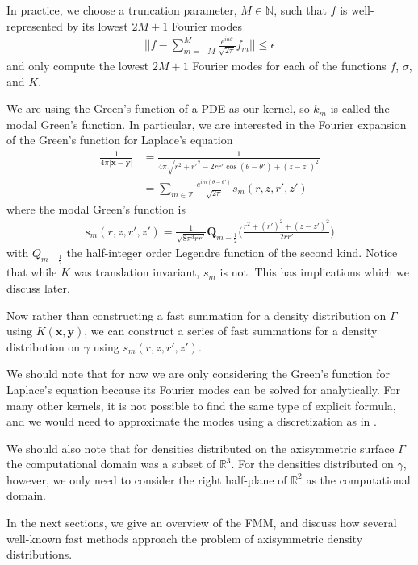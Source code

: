 \documentclass[11pt, oneside]{article}   	%
\begin{document}
In practice, we choose a truncation parameter, $M\in\mathbb{N}$, such that $f$ is well-represented by its lowest $2M+1$ Fourier modes
\begin{align}
||f-\sum\limits_{m=-M}^{M}\frac{e^{in\theta}}{\sqrt{2\pi}}f_m||\le\epsilon
\end{align}
and only compute the lowest $2M+1$ Fourier modes for each of the functions $f$, $\sigma$, and $K$.

We are using the Green's function of a PDE as our kernel, so $k_m$ is called the modal Green's function. In particular, we are interested in the Fourier expansion of the Green's function for Laplace's equation
\begin{align}
\frac{1}{4\pi |\mathbf{x}-\mathbf{y}|} &=\frac{1}{4\pi\sqrt{r^2+r'^2-2rr'\cos{(\theta-\theta')}+(z-z')^2}}\\
&= \sum_{m\in\mathbb{Z}} \frac{e^{im(\theta-\theta')}}{\sqrt{2\pi}} s_m(r,z,r',z')
\end{align}
where the modal Green's function is
\begin{align}
s_m(r,z,r',z')=\frac{1}{\sqrt{8\pi^3 rr'}}\mathbf{Q}_{m-\frac{1}{2}}\bigg(\frac{r^2+(r')^2+(z-z')^2}{2rr'}\bigg)
\end{align}
with $Q_{m-\frac{1}{2}}$ the half-integer order Legendre function of the second kind. Notice that while $K$ was translation invariant, $s_m$ is not. This has implications which we discuss later.

Now rather than constructing a fast summation for a density distribution on $\Gamma$ using $K(\mathbf{x},\mathbf{y})$, we can construct a series of fast summations for a density distribution on $\gamma$ using $s_m(r,z,r',z')$.

We should note that for now we are only considering the Green's function for Laplace's equation because its Fourier modes can be solved for analytically. For many other kernels, it is not possible to find the same type of explicit formula, and we would need to approximate the modes using a discretization as in \cite{YYM}.

We should also note that for densities distributed on the axisymmetric surface $\Gamma$ the computational domain was a subset of $\mathbb{R}^3$. For the densities distributed on $\gamma$, however, we only need to consider the right half-plane of $\mathbb{R}^2$ as the computational domain.

In the next sections, we give an overview of the FMM, and discuss how several well-known fast methods approach the problem of axisymmetric density distributions.
\end{document}
